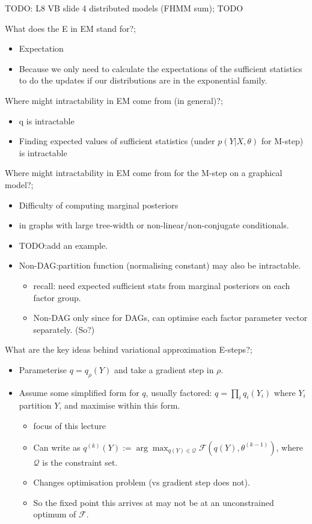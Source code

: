 \documentclass{article}
\begin{document}
TODO: L8 VB slide 4 distributed models (FHMM sum); TODO

What does the E in EM stand for?; \begin{itemize} \item Expectation \item Because we only need to calculate the expectations of the sufficient statistics to do the updates if our distributions are in the exponential family.  \end{itemize}

Where might intractability in EM come from (in general)?; \begin{itemize} \item q is intractable \item Finding expected values of sufficient statistics (under $p(Y|X,\theta)$ for M-step) is intractable \end{itemize}

Where might intractability in EM come from for the M-step on a graphical model?; \begin{itemize} \item Difficulty of computing marginal posteriors \item in graphs with large tree-width or non-linear/non-conjugate conditionals.  \item TODO:add an example.  \item Non-DAG:partition function (normalising constant) may also be intractable.  \begin{itemize} \item recall: need expected sufficient stats from marginal posteriors on each factor group.  \item Non-DAG only since for DAGs, can optimise each factor parameter vector separately. (So?) \end{itemize} \end{itemize}

What are the key ideas behind variational approximation E-steps?; \begin{itemize} \item Parameterise $q=q_{\rho}(Y)$ and take a gradient step in $\rho$.  \item Assume some simplified form for $q$, usually factored: $q=\prod_i q_i(Y_i)$ where $Y_i$ partition $Y$, and maximise within this form.  \begin{itemize} \item focus of this lecture \item Can write as $q^{(k)}(Y):=\arg\max_{q(Y)\in\mathcal{Q}}\mathcal{F}(q(Y),\theta^{(k-1)})$, where $\mathcal{Q}$ is the constraint set.  \item Changes optimisation problem (vs gradient step does not).  \item So the fixed point this arrives at may not be at an unconstrained optimum of $\mathcal{F}$.  \end{itemize} \end{itemize}
\end{document}
